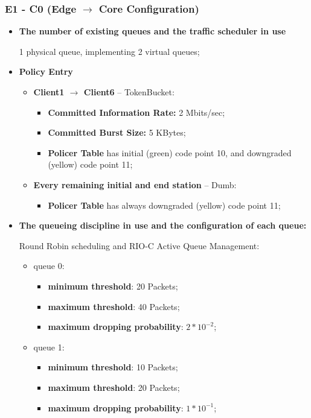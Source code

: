 \documentclass[conference,compsoc]{IEEEtran}
\begin{document}
     \subsubsection{E1 - C0 (Edge $\rightarrow$ Core Configuration)}
     \begin{itemize}
     \item \textbf{The number of existing queues and the traffic scheduler in use} \par 
     1 physical queue,  implementing 2 virtual queues;  
     \vspace{5mm}
     \item \textbf{Policy Entry}
     \begin{itemize}
     \item \textbf{Client1 $\rightarrow$ Client6} -- TokenBucket:
     \begin{itemize}
     \item \textbf{Committed Information Rate:} 2 Mbits/sec;
     \item \textbf{Committed Burst Size:} 5 KBytes;
     \item \textbf{Policer Table} has initial (green) code point 10, and downgraded (yellow) code point 11;
     \end{itemize}
     \item \textbf{Every remaining initial and end station} -- Dumb:
     \begin{itemize}
     \item \textbf{Policer Table} has always downgraded (yellow) code point 11;
     \end{itemize}
     \end{itemize}

     \vspace{5mm}
     \item \textbf{The queueing discipline in use and the configuration of each queue:}\par
     Round Robin scheduling and RIO-C Active Queue Management: \par 
     \begin{itemize}
     \item queue 0:
     \begin{itemize}
     \item \textbf{minimum threshold}: 20 Packets;
     \item \textbf{maximum threshold}: 40 Packets;
     \item \textbf{maximum dropping probability}: $2 * 10^{-2}$;
     \end{itemize}
     \item queue 1:
     \begin{itemize}
     \item \textbf{minimum threshold}: 10 Packets;
     \item \textbf{maximum threshold}: 20 Packets;
     \item \textbf{maximum dropping probability}:  $1 * 10^{-1}$;
     \end{itemize}
     \end{itemize}


\end{itemize}
\end{document}
